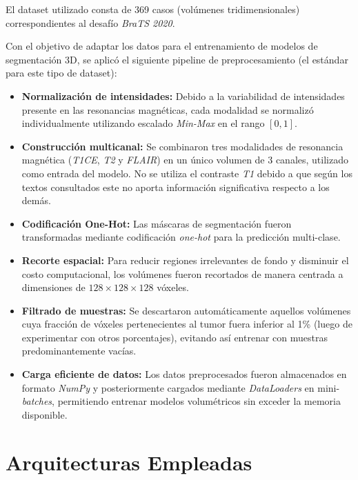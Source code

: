 El dataset utilizado consta de 369 casos (volúmenes tridimensionales) correspondientes al desafío \textit{BraTS 2020}. 

Con el objetivo de adaptar los datos para el entrenamiento de modelos de segmentación 3D, se aplicó el siguiente pipeline de preprocesamiento (el estándar para este tipo de dataset):

\begin{itemize}
    \item \textbf{Normalización de intensidades:} Debido a la variabilidad de intensidades presente en las resonancias magnéticas, cada modalidad se normalizó individualmente utilizando escalado \textit{Min-Max} en el rango $[0,1]$.

    \item \textbf{Construcción multicanal:} Se combinaron tres modalidades de resonancia magnética (\textit{T1CE}, \textit{T2} y \textit{FLAIR}) en un único volumen de 3 canales, utilizado como entrada del modelo. No se utiliza el contraste \textit{T1} debido a que según los textos consultados este no aporta información significativa respecto a los demás.

    \item \textbf{Codificación One-Hot:} Las máscaras de segmentación fueron transformadas mediante codificación \textit{one-hot} para la predicción multi-clase.

    \item \textbf{Recorte espacial:} Para reducir regiones irrelevantes de fondo y disminuir el costo computacional, los volúmenes fueron recortados de manera centrada a dimensiones de $128 \times 128 \times 128$ vóxeles.

    \item \textbf{Filtrado de muestras:} Se descartaron automáticamente aquellos volúmenes cuya fracción de vóxeles pertenecientes al tumor fuera inferior al 1\% (luego de experimentar con otros porcentajes), evitando así entrenar con muestras predominantemente vacías.

    \item \textbf{Carga eficiente de datos:} Los datos preprocesados fueron almacenados en formato \textit{NumPy} y posteriormente cargados mediante \textit{DataLoaders} en mini-\textit{batches}, permitiendo entrenar modelos volumétricos sin exceder la memoria disponible.
\end{itemize}

\section{Arquitecturas Empleadas}

